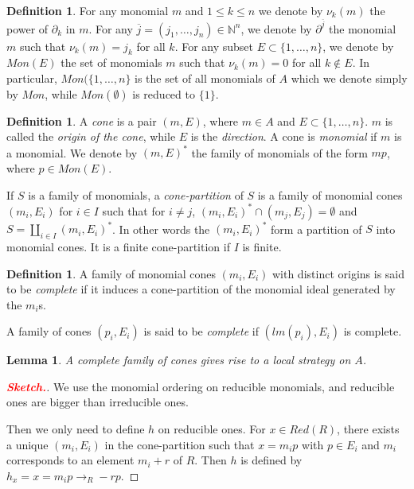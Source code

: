 \documentclass[10pt]{easychair}
\newtheorem{lemma}[theorem]{Lemma}
\theoremstyle{definition}
\newtheorem{definition}[theorem]{Definition}
\newcommand\todo[1]{{\bf\textcolor{red}{#1.}}}
\newcommand\rewR{\to_R}
\begin{document}
\begin{definition}
 For any monomial $m$ and $1 \leq k \leq n$ we denote by $\nu_k(m)$ the power of $\partial_k$ in $m$.
For any $\overline j =(j_1,\ldots,j_n) \in \mathbb N^n$, we denote by $\partial^{\overline j}$ the monomial $m$ such that $\nu_k(m) = j_k$ for all $k$. For any subset $E \subset \{1,\ldots,n\}$, we denote by $Mon(E)$ the set of monomials $m$ such that $\nu_k(m) = 0$ for all $k \notin E$. In particular, $Mon(\{1,\ldots,n\}$ is the set of all monomials of $A$ which we denote simply by $Mon$, while $Mon(\emptyset)$ is reduced to $\{1\}$. 
\end{definition}

\begin{definition}
  A \emph{cone} is a pair $(m,E)$, where $m \in A$ and $E \subset \{1,\ldots,n\}$. $m$ is called the \emph{origin of the cone}, while $E$ is the \emph{direction}. A cone is \emph{monomial} if $m$ is a monomial. We denote by $(m,E)^*$ the family of monomials of the form $mp$, where $p \in Mon(E)$.

  If $S$ is a family of monomials, a \emph{cone-partition} of $S$ is a family of monomial cones $(m_i,E_i)$ for $i \in I$ such that for $i \neq j$, $(m_i,E_i)^* \cap (m_j,E_j) = \emptyset$ and $S = \coprod_{i \in I} (m_i,E_i)^*$. In other words the $(m_i,E_i)^*$ form a partition of $S$ into monomial cones. It is a finite cone-partition if $I$ is finite.
\end{definition}


 \begin{definition}
   A family of monomial cones $(m_i,E_i)$ with distinct origins is said to be \emph{complete} if it induces a cone-partition of the monomial ideal generated by the $m_i$s. 

   A family of cones $(p_i,E_i)$ is said to be \emph{complete} if $(lm(p_i),E_i)$ is complete. 
 \end{definition}

 \begin{lemma}
  A complete family of cones gives rise to a local strategy on $A$. 
\end{lemma}
\begin{proof}[\todo{Sketch}]
  We use the monomial ordering on reducible monomials, and reducible ones are bigger than irreducible ones.

  Then we only need to define $h$ on reducible ones. For $x \in Red(R)$, there exists a unique $(m_i,E_i)$ in the cone-partition such that $x=m_i p$ with $p \in E_i$ and $m_i$ corresponds to an element $m_i + r$ of $R$. Then $h$ is defined by $h_x = x = m_ip  \rewR -rp$.
\end{proof}
\end{document}
